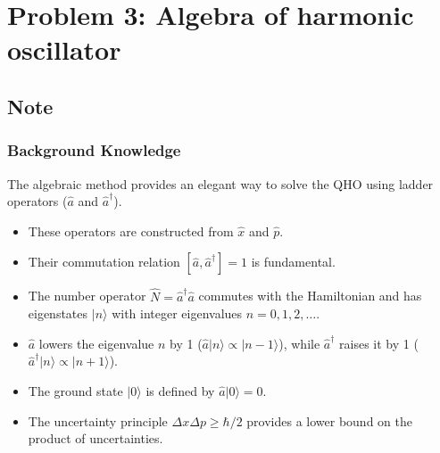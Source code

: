 \documentclass[10pt]{article}
\begin{document}
\section*{Problem 3: Algebra of harmonic oscillator}

\subsection*{Note}

\subsubsection*{Background Knowledge}
The algebraic method provides an elegant way to solve the QHO using ladder operators (\(\hat{a}\) and \(\hat{a}^\dagger\)).
\begin{itemize}
    \item These operators are constructed from \(\hat{x}\) and \(\hat{p}\).
    \item Their commutation relation \([\hat{a}, \hat{a}^\dagger] = 1\) is fundamental.
    \item The number operator \(\hat{N} = \hat{a}^\dagger \hat{a}\) commutes with the Hamiltonian and has eigenstates \(|n\rangle\) with integer eigenvalues \(n=0, 1, 2, \dots\).
    \item \(\hat{a}\) lowers the eigenvalue \(n\) by 1 (\(\hat{a}|n\rangle \propto |n-1\rangle\)), while \(\hat{a}^\dagger\) raises it by 1 (\(\hat{a}^\dagger|n\rangle \propto |n+1\rangle\)).
    \item The ground state \(|0\rangle\) is defined by \(\hat{a}|0\rangle = 0\).
    \item The uncertainty principle \(\Delta x \Delta p \ge \hbar/2\) provides a lower bound on the product of uncertainties.
\end{itemize}
\end{document}
